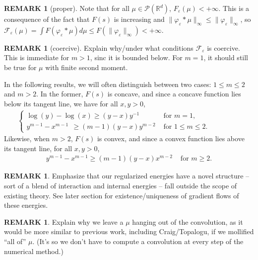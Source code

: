 \documentclass[11pt,leqno]{amsart}
\theoremstyle{definition}
\newtheorem{remark}[thm]{REMARK}
\newcommand{\Rd}{{\mathord{\mathbb R}^d}}
\newcommand{\F}{\mathcal{F}}
\def\P{{\mathcal P}}
\def\e{\varepsilon}
\def\F{\mathcal{F}}
\begin{document}
\begin{remark}[proper]
Note that for all $\mu \in \P(\Rd)$, $F_\e(\mu) <+\infty$. This is a consequence of the fact that $F(s)$ is increasing and $\|\varphi_\e*\mu\|_\infty \leq \|\varphi_\e\|_\infty$, so $\F_\e(\mu) = \int F(\varphi_\e*\mu) d\mu \leq F(\|\varphi_\e\|_\infty) < +\infty$.
\end{remark}

\begin{remark}[coercive]
{\color{Aquamarine} Explain why/under what conditions $\F_\e$ is coercive. This is immediate for $m > 1$, sinc it is bounded below. For $m=1$, it should still be true for $\mu$ with finite second moment. }
\end{remark}

In the following results, we will often distinguish between two cases: $1 \leq m \leq 2$ and $m >2$. In the former, $F(s)$ is concave, and since a concave function lies below its tangent line, we have for all $x,y >0$,
\begin{align} \label{tangent line concave} 
\begin{cases} \log(y) - \log(x) \geq (y-x) y^{-1} &\text{ for } m=1 , \qquad \qquad \qquad \\
y^{m-1} - x^{m-1}  \ \ \geq (m-1)(y-x) y^{m-2} &\text{ for }1 \leq m \leq 2. \end{cases}
\end{align}
Likewise, when $m>2$, $F(s)$ is convex, and since a convex function lies above its tangent line, for all $x,y >0$,
\begin{align} \label{tangent line convex} 
y^{m-1} - x^{m-1} \geq (m-1)(y-x) x^{m-2} &\text{ for }m\geq2. 
\end{align}

{\color{Aquamarine}  \begin{remark}
Emphasize that our regularized energies have a novel structure -- sort of a blend of interaction and internal energies -- fall outside the scope of existing theory. See later section for existence/uniqueness of gradient flows of these energies.
\end{remark}}

{\color{Aquamarine}  \begin{remark}
Explain why we leave a $\mu$ hanging out of the convolution, as it would be more similar to previous work, including Craig/Topalogu, if we mollified ``all of'' $\mu$. (It's so we don't have to compute a convolution at every step of the numerical method.)
\end{remark}}
\end{document}
